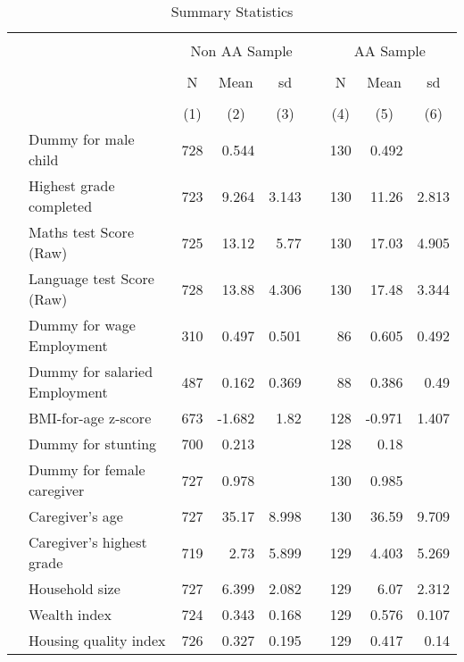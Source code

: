 \begin{table}[ht]
\centering
\caption{Summary Statistics} 
\label{tab:01}
\begin{tabular}{llrrrlrrr}
  \toprule
   \\[-1.8ex]  & & \multicolumn{3}{c}{Non AA Sample} & & \multicolumn{3}{c}{AA Sample}  \\[0.2ex] \cline{3-5}  \cline{7-9}  \\[-1.2ex]  & & \multicolumn{1}{c}{N} & \multicolumn{1}{c}{Mean} & \multicolumn{1}{c}{sd} & & \multicolumn{1}{c}{N} & \multicolumn{1}{c}{Mean} & \multicolumn{1}{c}{sd} \\  \\[-1.8ex] &  & \multicolumn{1}{c}{(1)} & \multicolumn{1}{c}{(2)} & \multicolumn{1}{c}{(3)} & & 
  \multicolumn{1}{c}{(4)} & \multicolumn{1}{c}{(5)} & \multicolumn{1}{c}{(6)} \\  \midrule
 & Dummy for male child &   728 & 0.544 &  &  &   130 & 0.492 &  \\ 
   & Highest grade completed &   723 & 9.264 & 3.143 &  &   130 & 11.26 & 2.813 \\ 
   & Maths test Score (Raw) &   725 & 13.12 &  5.77 &  &   130 & 17.03 & 4.905 \\ 
   & Language test Score (Raw) &   728 & 13.88 & 4.306 &  &   130 & 17.48 & 3.344 \\ 
   & Dummy for wage Employment &   310 & 0.497 & 0.501 &  &    86 & 0.605 & 0.492 \\ 
   & Dummy for salaried Employment &   487 & 0.162 & 0.369 &  &    88 & 0.386 &  0.49 \\ 
   & BMI-for-age z-score &   673 & -1.682 &  1.82 &  &   128 & -0.971 & 1.407 \\ 
   & Dummy for stunting &   700 & 0.213 &  &  &   128 &  0.18 &  \\ 
   & Dummy for female caregiver &   727 & 0.978 &  &  &   130 & 0.985 &  \\ 
   & Caregiver's age &   727 & 35.17 & 8.998 &  &   130 & 36.59 & 9.709 \\ 
   & Caregiver's highest grade &   719 &  2.73 & 5.899 &  &   129 & 4.403 & 5.269 \\ 
   & Household size &   727 & 6.399 & 2.082 &  &   129 &  6.07 & 2.312 \\ 
   & Wealth index &   724 & 0.343 & 0.168 &  &   129 & 0.576 & 0.107 \\ 
   & Housing quality index &   726 & 0.327 & 0.195 &  &   129 & 0.417 &  0.14 \\ 

\end{tabular}
\end{table}
